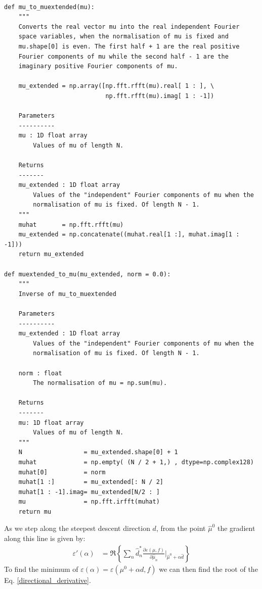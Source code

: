 \documentclass[11pt]{article}
\begin{document}
\begin{verbatim}

def mu_to_muextended(mu):
    """
    Converts the real vector mu into the real independent Fourier
    space variables, when the normalisation of mu is fixed and 
    mu.shape[0] is even. The first half + 1 are the real positive 
    Fourier components of mu while the second half - 1 are the
    imaginary positive Fourier components of mu.

    mu_extended = np.array([np.fft.rfft(mu).real[ 1 : ], \
                            np.fft.rfft(mu).imag[ 1 : -1])

    Parameters
    ----------
    mu : 1D float array
        Values of mu of length N.
            
    Returns
    -------
    mu_extended : 1D float array
        Values of the "independent" Fourier components of mu when the 
        normalisation of mu is fixed. Of length N - 1.
    """
    muhat       = np.fft.rfft(mu)
    mu_extended = np.concatenate((muhat.real[1 :], muhat.imag[1 : -1]))
    return mu_extended

def muextended_to_mu(mu_extended, norm = 0.0):
    """
    Inverse of mu_to_muextended

    Parameters
    ----------
    mu_extended : 1D float array
        Values of the "independent" Fourier components of mu when the 
        normalisation of mu is fixed. Of length N - 1.

    norm : float
        The normalisation of mu = np.sum(mu).
            
    Returns
    -------
    mu: 1D float array
        Values of mu of length N.
    """
    N                 = mu_extended.shape[0] + 1
    muhat             = np.empty( (N / 2 + 1,) , dtype=np.complex128)
    muhat[0]          = norm
    muhat[1 :]        = mu_extended[: N / 2]
    muhat[1 : -1].imag= mu_extended[N/2 : ]
    mu                = np.fft.irfft(muhat)
    return mu

\end{verbatim}
\fi

As we step along the steepest descent direction $d$, from the point $\hat{\mu}^0$ the gradient along this line is given by:
\begin{align}
   \varepsilon'(\alpha) &= \Re\left\{\sum_n \hat{d}^*_n \frac{\partial \varepsilon(\mu, f)}{\partial \hat{\mu}_n}|_{\hat{\mu}^0 + \alpha \hat{d}} \right\}
   \label{directional_derivative}
\end{align}
To find the minimum of $\varepsilon(\alpha) = \varepsilon(\mu^0 + \alpha d, f)$ we can then find the root of the Eq. \ref{directional_derivative}. 
\end{document}
